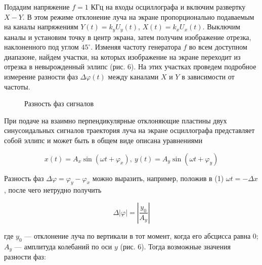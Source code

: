 \documentclass[14pt]{article}
\begin{document}
Подадим напряжение $f = 1$ КГц на входы осциллографа и включим развертку $X-Y$. В этом режиме отклонение луча на экране пропорционально подаваемым на каналы напряжениям $Y(t) = k_yU_y(t)$, $X	(t) = k_xU_x(t)$. Выключим каналы и установим точку в центр экрана, затем получим изображение отрезка, наклоненного под углом $45^{\circ}$. Изменяя частоту генератора $f$ во всем доступном диапазоне, найдем участки, на которых изображение на экране переходит из отрезка в невырожденный эллипс (рис. 6). На этих участках проведем подробное измерение разности фаз $\Delta \varphi(t)$ между каналами $X$ и $Y$ в зависимости от частоты.

\begin{figure}[h!]
	\caption{Разность фаз сигналов}
	\label{fig:image}
\end{figure}

При подаче на взаимно перпендикулярные отклоняющие пластины двух синусоидальных сигналов траектория луча на экране осциллографа представляет собой эллипс и может быть в общем виде описана уравнениями

\setcounter{equation}{0}
\begin{equation}
x(t) = A_x \sin(\omega t + \varphi_x),~
y(t) = A_y \sin(\omega t + \varphi_y)
\end{equation}

\noindent Разность фаз $\Delta\varphi = \varphi_y - \varphi_x$ можно выразить, например, положив в (1) $\omega t = - \Delta x$, после чего нетрудно получить

\begin{equation}
\Delta \left|\varphi\right| = \left|\frac{y_0}{A_y}\right|
\end{equation}

\noindent где $y_0$ --- отклонение луча по вертикали в тот момент, когда его абсцисса равна 0; $A_y$ --- амплитуда колебаний по оси 
$y$ (рис. 6). Тогда возможные значения разности фаз:
\end{document}
